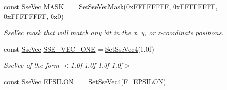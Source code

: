 \begin{DoxyCompactItemize}
const \hyperlink{namespacegfxmath_a0de2243e2b8d0fd46d3af5e036423004}{Sse\+Vec} \hyperlink{namespacegfxmath_a9aed12c2814b84ca35d5d256596bf68e}{M\+A\+S\+K\+\_} = \hyperlink{namespacegfxmath_ae6fdce7b817a9d0caea6a71c5a377bbb}{Set\+Sse\+Vec\+Mask}(0x\+F\+F\+F\+F\+F\+F\+F\+F, 0x\+F\+F\+F\+F\+F\+F\+F\+F, 0x\+F\+F\+F\+F\+F\+F\+F\+F, 0x0)
\begin{DoxyCompactList}\small\item\em Sse\+Vec mask that will match any bit in the x, y, or z-\/coordinate positions. \end{DoxyCompactList}\item 
\hypertarget{namespacegfxmath_a968d22c794bb9a46309737cb9a8112d2}{}const \hyperlink{namespacegfxmath_a0de2243e2b8d0fd46d3af5e036423004}{Sse\+Vec} \hyperlink{namespacegfxmath_a968d22c794bb9a46309737cb9a8112d2}{S\+S\+E\+\_\+\+V\+E\+C\+\_\+\+O\+N\+E} = \hyperlink{namespacegfxmath_a3b21a4362c6ac781c5f6ab922840ba77}{Set\+Sse\+Vec4}(1.\+0f)\label{namespacegfxmath_a968d22c794bb9a46309737cb9a8112d2}

\begin{DoxyCompactList}\small\item\em Sse\+Vec of the form $<$1.\+0f 1.\+0f 1.\+0f 1.\+0f$>$ \end{DoxyCompactList}\item 
\hypertarget{namespacegfxmath_a61d187e87e07e248aaebb359a772f815}{}const \hyperlink{namespacegfxmath_a0de2243e2b8d0fd46d3af5e036423004}{Sse\+Vec} \hyperlink{namespacegfxmath_a61d187e87e07e248aaebb359a772f815}{E\+P\+S\+I\+L\+O\+N\+\_} = \hyperlink{namespacegfxmath_a3b21a4362c6ac781c5f6ab922840ba77}{Set\+Sse\+Vec4}(\hyperlink{group___scalar_math_consts_gac554360386eb65fd9657715e0b12d7d7}{F\+\_\+\+E\+P\+S\+I\+L\+O\+N})\label{namespacegfxmath_a61d187e87e07e248aaebb359a772f815}


\end{DoxyCompactItemize}
